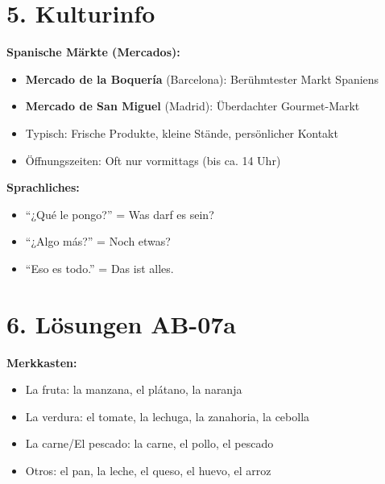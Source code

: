 \documentclass[11pt, a4paper]{article}
\begin{document}

\section*{5. Kulturinfo}

\begin{kulturbox}
\textbf{Spanische Märkte (Mercados):}
\begin{itemize}
    \item \textbf{Mercado de la Boquería} (Barcelona): Berühmtester Markt Spaniens
    \item \textbf{Mercado de San Miguel} (Madrid): Überdachter Gourmet-Markt
    \item Typisch: Frische Produkte, kleine Stände, persönlicher Kontakt
    \item Öffnungszeiten: Oft nur vormittags (bis ca. 14 Uhr)
\end{itemize}

\textbf{Sprachliches:}
\begin{itemize}
    \item ``¿Qué le pongo?'' = Was darf es sein?
    \item ``¿Algo más?'' = Noch etwas?
    \item ``Eso es todo.'' = Das ist alles.
\end{itemize}
\end{kulturbox}


\section*{6. Lösungen AB-07a}

\textbf{Merkkasten:}
\begin{itemize}
    \item La fruta: la manzana, el plátano, la naranja
    \item La verdura: el tomate, la lechuga, la zanahoria, la cebolla
    \item La carne/El pescado: la carne, el pollo, el pescado
    \item Otros: el pan, la leche, el queso, el huevo, el arroz
\end{itemize}
\end{document}
